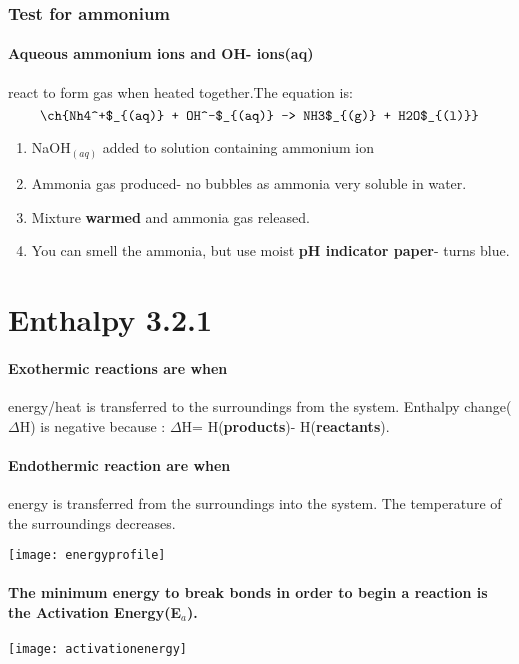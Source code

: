 \subsubsection{Test for ammonium }
\paragraph{Aqueous ammonium ions and OH- ions(aq)}react to form gas when heated together.The equation is:
\begin{equation}
\ch{Nh4^+$_{(aq)} + OH^-$_{(aq)} -> NH3$_{(g)} + H2O$_{(l)}}
\end{equation}
\begin{enumerate}
\item NaOH$_{(aq)}$ added to solution containing ammonium ion
\item Ammonia gas produced- no bubbles as ammonia very soluble in water.
\item Mixture \textbf{warmed} and ammonia gas released.
\item You can smell the ammonia, but use moist \textbf{pH indicator paper}- turns blue.
\end{enumerate}
\section{Enthalpy 3.2.1}
\paragraph{Exothermic reactions are when}energy/heat is transferred to the surroundings from the system. Enthalpy change($\Delta$H) is negative because :
\newline $\Delta$H= H(\textbf{products})- H(\textbf{reactants}).
\paragraph{Endothermic reaction are when}energy is transferred from the surroundings into the system. The temperature of the surroundings decreases.
\begin{center}
\texttt{[image: energyprofile]}
\end{center}
\paragraph{The minimum energy to break bonds in order to begin a reaction is the Activation Energy(E$_a$).}
\begin{center}
\texttt{[image: activationenergy]}
\end{center}
